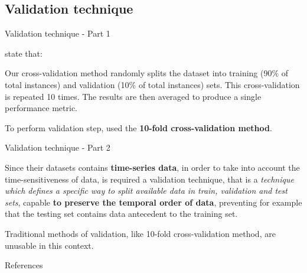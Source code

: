 \documentclass[10pt]{beamer}
\begin{document}
\subsection{Validation technique}
\begin{frame}{Validation technique - Part 1}

\citet{ITPAReport} state that:
\justifying
\begin{quoting}[font=itshape, begintext={``}, endtext={''}]
Our cross-validation method randomly splits the dataset into training (90\% of total instances) and validation (10\% of total instances) sets. This cross-validation is repeated 10 times. The results are then averaged to produce a single performance metric. 
\end{quoting}

\begin{block}{}
To perform validation step, \citet{ITPAReport} used the \textbf{10-fold cross-validation method}.
\end{block}


\end{frame} 

\begin{frame}{Validation technique - Part 2}

\begin{block}{}
Since their datasets contains \textbf{time-series data}, in order to take into account the time-sensitiveness of data, is required a validation technique, that is a \textit{technique which defines a specific way to split available data in train, validation and test sets}, capable \textbf{to preserve the temporal order of data}, preventing for example that the testing set contains data antecedent to the training set.
\end{block}

\begin{block}{}
Traditional methods of validation, like 10-fold cross-validation method, are unusable in this context.
\end{block}

\end{frame} 







\begin{frame}[noframenumbering,shrink=15]{References}
\printbibliography
\end{frame}
\end{document}
